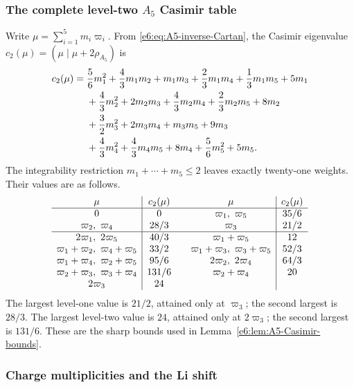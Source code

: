\documentclass[11pt,reqno]{amsart}
\theoremstyle{definition}
\theoremstyle{remark}
\begin{document}
\subsubsection{The complete level-two \texorpdfstring{$A_5$}{A5} Casimir table}
\label{e6:app:A5-Casimir-table}

Write \(\mu=\sum_{i=1}^5m_i\varpi_i\).  From
\eqref{e6:eq:A5-inverse-Cartan}, the Casimir eigenvalue
\(c_2(\mu)=(\mu\mid\mu+2\rho_{A_5})\) is
\begin{align*}
 c_2(\mu)={}&
 \frac56m_1^2+\frac43m_1m_2+m_1m_3
 +\frac23m_1m_4+\frac13m_1m_5+5m_1\notag\\
 &+\frac43m_2^2+2m_2m_3+\frac43m_2m_4
 +\frac23m_2m_5+8m_2\notag\\
 &+\frac32m_3^2+2m_3m_4+m_3m_5+9m_3\notag\\
 &+\frac43m_4^2+\frac43m_4m_5+8m_4
 +\frac56m_5^2+5m_5.
\end{align*}
The integrability restriction \(m_1+\cdots+m_5\le2\) leaves exactly twenty-one
weights.  Their values are as follows.
\begin{equation*}
\begin{array}{c|c@{\qquad}c|c}
\mu&c_2(\mu)&\mu&c_2(\mu)\\ \hline
0&0
 &\varpi_1,\ \varpi_5&35/6\\
\varpi_2,\ \varpi_4&28/3
 &\varpi_3&21/2\\ \hline
2\varpi_1,\ 2\varpi_5&40/3
 &\varpi_1+\varpi_5&12\\
\varpi_1+\varpi_2,\ \varpi_4+\varpi_5&33/2
 &\varpi_1+\varpi_3,\ \varpi_3+\varpi_5&52/3\\
\varpi_1+\varpi_4,\ \varpi_2+\varpi_5&95/6
 &2\varpi_2,\ 2\varpi_4&64/3\\
\varpi_2+\varpi_3,\ \varpi_3+\varpi_4&131/6
 &\varpi_2+\varpi_4&20\\
2\varpi_3&24&&
\end{array}
\end{equation*}
The largest level-one value is \(21/2\), attained only at \(\varpi_3\); the
second largest is \(28/3\).  The largest level-two value is \(24\), attained only
at \(2\varpi_3\); the second largest is \(131/6\).  These are the sharp bounds
used in Lemma~\ref{e6:lem:A5-Casimir-bounds}.

\subsubsection{Charge multiplicities and the Li shift}
\label{e6:app:Li-charge-calculation}
\end{document}
